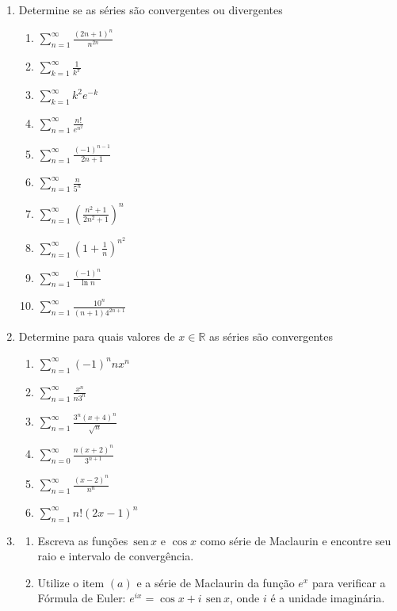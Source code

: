 \documentclass[a4paper,5pt]{amsbook}
\renewcommand{\sin}{\,\mbox{sen}\,}
\newcommand{\ds}{\displaystyle}
\begin{document}
\vspace{1cm}
\begin{enumerate}
    \setlength\itemsep{0.5cm}
    \item Determine se as s\'eries s\~ao convergentes ou divergentes
    	\begin{enumerate}
            \setlength\itemsep{0.2cm}
    		\item $\ds\sum_{n=1}^\infty \frac{(2n+1)^n}{n^{2n}}$
    		\item $\ds\sum_{k=1}^\infty \frac{1}{k^\pi}$
    		\item $\ds\sum_{k=1}^\infty k^2 e^{-k}$
    		\item $\ds\sum_{n=1}^\infty \frac{n!}{e^{n^2}}$
            \item $\ds\sum_{n=1}^\infty \frac{(-1)^{n-1}}{2n+1}$
            \item $\ds\sum_{n=1}^\infty \frac{n}{5^n}$
            \item $\ds\sum_{n=1}^\infty \left(\frac{n^2+1}{2n^2+1}\right)^n$
            \item $\ds\sum_{n=1}^\infty \left(1+\frac{1}{n}\right)^{n^2}$
            \item $\ds\sum_{n=1}^\infty \frac{(-1)^n}{\ln{n}}$
            \item $\ds\sum_{n=1}^\infty \frac{10^n}{(n+1)4^{2n+1}}$
    	\end{enumerate}

    \item Determine para quais valores de $x\in\mathbb{R}$ as s\'eries s\~ao
    convergentes
    	\begin{enumerate}
    		\item $\ds\sum_{n=1}^\infty (-1)^n nx^n$
    		\item $\ds\sum_{n=1}^\infty \frac{x^n}{n3^n}$
    		\item $\ds\sum_{n=1}^\infty \frac{3^n(x+4)^n}{\sqrt{n}}$
    		\item $\ds\sum_{n=0}^\infty \frac{n(x+2)^n}{3^{n+1}}$
    		\item $\ds\sum_{n=1}^\infty \frac{(x-2)^n}{n^n}$
    		\item $\ds\sum_{n=1}^\infty n!(2x-1)^n$
    	\end{enumerate}
    
    \item
    	\begin{enumerate}
            \item Escreva as fun\c{c}\~oes $\sin x$ e $\cos x$ como s\'erie de
            Maclaurin e encontre seu raio e intervalo de converg\^encia.
            \item Utilize o item $(a)$ e a s\'erie de Maclaurin da fun\c{c}\~ao $e^x$
            para verificar a F\'ormula de Euler: $e^{ix} = \cos x + i\ \sin x$, onde
            $i$ \'e a unidade imagin\'aria.
    	\end{enumerate}
    

\end{enumerate}
\end{document}
